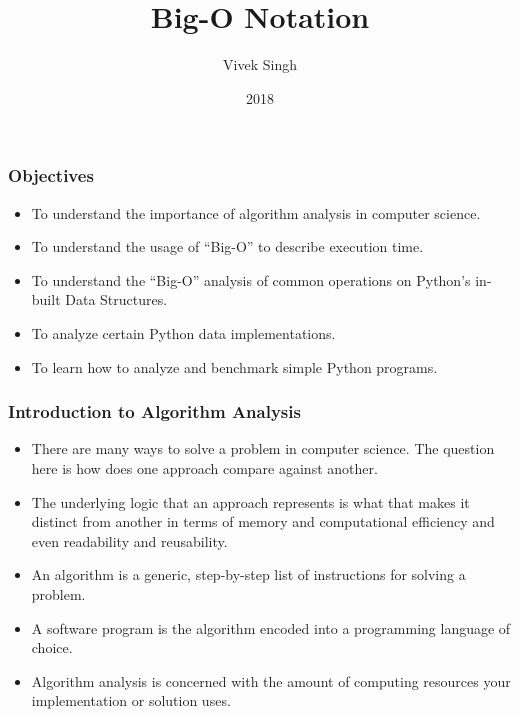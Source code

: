\documentclass{beamer}
\title{Big-O Notation}
\author{Vivek Singh}
\institute{Information Systems Decision Sciences (ISDS)\\
MUMA College of Business\\
University of South Florida \\
Tampa, Florida}
\date{2018}
\begin{document}
 
\frame{\titlepage}
 
\begin{frame}
\frametitle{Objectives}
\begin{itemize}
\item To understand the importance of algorithm analysis in computer science.
\item To understand the usage of “Big-O” to describe execution time.
\item To understand the “Big-O” analysis of common operations on Python's in-built Data Structures.
\item To analyze certain Python data implementations.
\item To learn how to analyze and benchmark simple Python programs.

\end{itemize}
\end{frame}

\begin{frame}
\frametitle{Introduction to Algorithm Analysis}
\begin{itemize}
\item There are many ways to solve a problem in computer science. The question here is how does one approach compare against another.
\item The underlying logic that an approach  represents is what that makes it distinct from another in terms of memory and computational efficiency and even readability and reusability.
\item An algorithm is a generic, step-by-step list of instructions for solving a problem.
\item A software program is the algorithm encoded into a programming language of choice. 
\item Algorithm analysis is concerned with the amount of computing resources your implementation or solution uses.
\end{itemize}
\end{frame}
\end{document}

